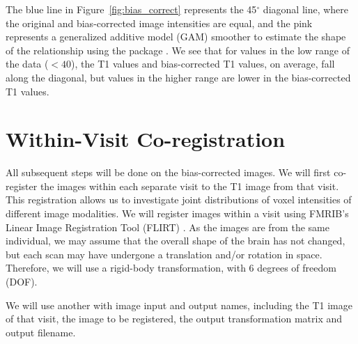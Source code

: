 


The blue line in Figure~\ref{fig:bias_correct}\protect{} represents the 45$^{\circ}$ diagonal line, where the original and bias-corrected image intensities are equal, and the pink represents a generalized additive model (GAM) \citep{hastie_generalized_1990} smoother to estimate the shape of the relationship using the  package \citep{wood_fast_2011}.  We see that for values in the low range of the data ($< 40$), the T1 values and bias-corrected T1 values, on average, fall along the diagonal, but values in the higher range are lower in the bias-corrected T1 values.






\section{Within-Visit Co-registration}
All subsequent steps will be done on the bias-corrected images.  We will first co-register the images within each separate visit to the T1 image from that visit.  This registration allows us to investigate joint distributions of voxel intensities of different image modalities.  We will register images within a visit using FMRIB's Linear Image Registration Tool (FLIRT) \citep{jenkinson_global_2001, jenkinson_improved_2002}.  As the images are from the same individual, we may assume that the overall shape of the brain has not changed, but each scan may have undergone a translation and/or rotation in space.  Therefore, we will use a rigid-body transformation, with $6$ degrees of freedom (DOF).  

We will use another  with image input and output names, including the T1 image of that visit, the image to be registered, the output transformation matrix and output filename.


\begin{knitrout}
\color{fgcolor}\begin{kframe}
\begin{alltt}
 \hlstd{)}
\end{alltt}
\end{kframe}
\end{knitrout}



